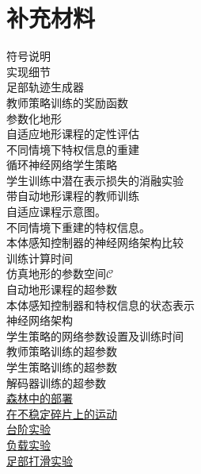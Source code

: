 \documentclass[9pt,twocolumn,twoside]{osajnl}
\begin{document}
\section*{补充材料}
 符号说明 \\
 实现细节\\
 足部轨迹生成器\\
 教师策略训练的奖励函数 \\
 参数化地形\\
 自适应地形课程的定性评估\\
 不同情境下特权信息的重建 \\
 循环神经网络学生策略 \\
 学生训练中潜在表示损失的消融实验\\
 带自动地形课程的教师训练\\
 自适应课程示意图。\\
 不同情境下重建的特权信息。\\
 本体感知控制器的神经网络架构比较 \\
 训练计算时间 \\
 仿真地形的参数空间$\mathcal{C}$\\
 自动地形课程的超参数\\
 本体感知控制器和特权信息的状态表示 \\
 神经网络架构 \\
 学生策略的网络参数设置及训练时间\\
 教师策略训练的超参数 \\
 学生策略训练的超参数 \\
 解码器训练的超参数\\
\href{https://youtu.be/txjqn8h6pjU}{ 森林中的部署} \\
\href{https://youtu.be/Xnn4sVSpSh0}{ 在不稳定碎片上的运动} \\
\href{https://youtu.be/tPixnjLbTvE}{ 台阶实验}   \\
\href{https://youtu.be/3Nr47MXCFO0}{ 负载实验}  \\
\href{https://youtu.be/aMPwB3t4idU}{ 足部打滑实验}
\end{document}
